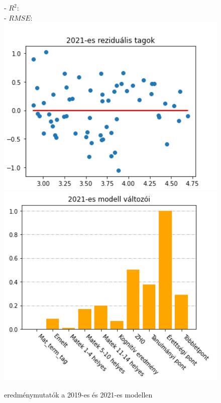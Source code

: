 \documentclass[12pt]{article}
\begin{document}
\begin{figure}[H]
\begin{minipage}[b]{0.4\textwidth}
    \raggedright
    - $R^2$: \\
    - $RMSE$: \\
        \centering
        \includegraphics[width=1\textwidth, left]{kepek/residual2021.png} %
        \includegraphics[width=1\textwidth, left]{kepek/kumulalt2021.png} %
    \end{minipage}
   \caption{eredménymutatók a 2019-es és 2021-es modellen}
   \label{fig:kumulalt}
\end{figure}

\begin{thebibliography}{9}
\end{thebibliography}
\end{document}
